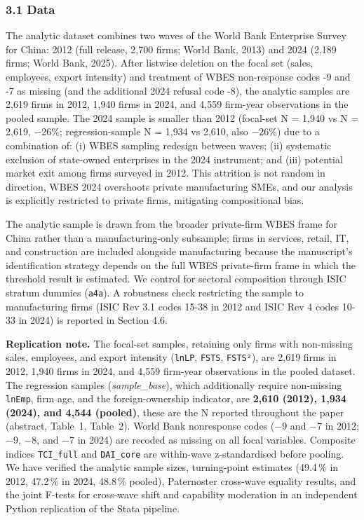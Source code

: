 \documentclass[12pt,a4paper]{article}
\begin{document}
\hypertarget{31-data}{%
\subsubsection{3.1 Data}\label{31-data}}

The analytic dataset combines two waves of the World Bank Enterprise
Survey for China: 2012 (full release, 2,700 firms; World Bank, 2013) and
2024 (2,189 firms; World Bank, 2025). After listwise deletion on the
focal set (sales, employees, export intensity) and treatment of WBES
non-response codes -9 and -7 as missing (and the additional 2024 refusal
code -8), the analytic samples are 2,619 firms in 2012, 1,940 firms in
2024, and 4,559 firm-year observations in the pooled sample. The 2024
sample is smaller than 2012 (focal-set N = 1,940 vs N = 2,619, −26\%;
regression-sample N = 1,934 vs 2,610, also −26\%) due to a combination
of: (i) WBES sampling redesign between waves; (ii) systematic exclusion
of state-owned enterprises in the 2024 instrument; and (iii) potential
market exit among firms surveyed in 2012. This attrition is not random
in direction, WBES 2024 overshoots private manufacturing SMEs, and our
analysis is explicitly restricted to private firms, mitigating
compositional bias.

The analytic sample is drawn from the broader private-firm WBES frame
for China rather than a manufacturing-only subsample; firms in services,
retail, IT, and construction are included alongside manufacturing
because the manuscript's identification strategy depends on the full
WBES private-firm frame in which the threshold result is estimated. We
control for sectoral composition through ISIC stratum dummies
(\texttt{a4a}). A robustness check restricting the sample to
manufacturing firms (ISIC Rev 3.1 codes 15-38 in 2012 and ISIC Rev 4
codes 10-33 in 2024) is reported in Section 4.6.

\textbf{Replication note.} The focal-set samples, retaining only firms
with non-missing sales, employees, and export intensity (\texttt{lnLP},
\texttt{FSTS}, \texttt{FSTS²}), are 2,619 firms in 2012, 1,940 firms in
2024, and 4,559 firm-year observations in the pooled dataset. The
regression samples (\emph{sample\_base}), which additionally require
non-missing \texttt{lnEmp}, firm age, and the foreign-ownership
indicator, are \textbf{2,610 (2012), 1,934 (2024), and 4,544 (pooled)},
these are the N reported throughout the paper (abstract, Table~1,
Table~2). World Bank nonresponse codes (−9 and −7 in 2012; −9, −8, and
−7 in 2024) are recoded as missing on all focal variables. Composite
indices \texttt{TCI\_full} and \texttt{DAI\_core} are within-wave
z-standardised before pooling. We have verified the analytic sample
sizes, turning-point estimates (49.4\,\% in 2012, 47.2\,\% in 2024,
48.8\,\% pooled), Paternoster cross-wave equality results, and the joint
F-tests for cross-wave shift and capability moderation in an independent
Python replication of the Stata pipeline.
\end{document}
